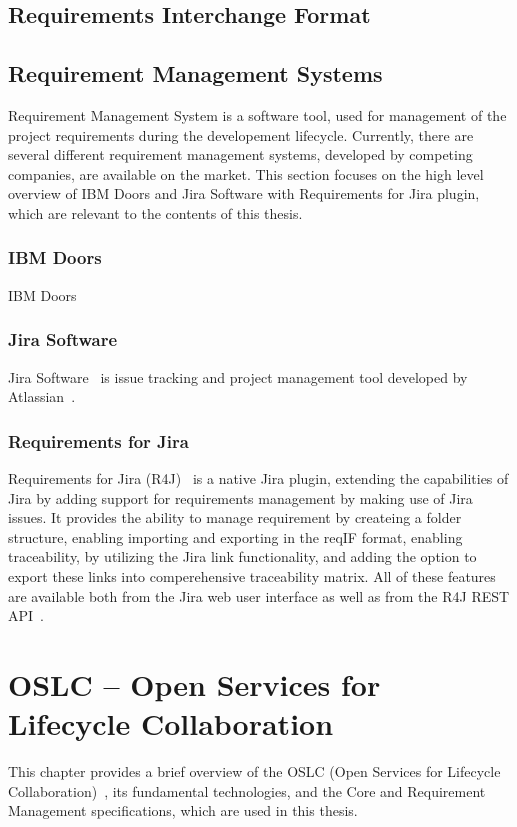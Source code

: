 \section{Requirements Interchange Format}

\section{Requirement Management Systems}
Requirement Management System is a software tool, used for management of the project requirements during the developement lifecycle. Currently, there are several different requirement management systems, developed by competing companies, are available on the market. This section focuses on the high level overview of IBM Doors and Jira Software with Requirements for Jira plugin, which are relevant to the contents of this thesis.

\subsection{IBM Doors}
IBM Doors \cite{ibm_doors} 

\subsection{Jira Software}
Jira Software \cite{jira} is issue tracking and project management tool developed by Atlassian \cite{atlassian}.

\subsection*{Requirements for Jira}
Requirements for Jira (R4J) \cite{requirements_for_jira} is a native Jira plugin, extending the capabilities of Jira by adding support for requirements management by making use of Jira issues. It provides the ability to manage requirement by createing a folder structure, enabling importing and exporting in the reqIF format, enabling traceability, by utilizing the Jira link functionality, and adding the option to export these links into comperehensive traceability matrix. All of these features are available both from the Jira web user interface as well as from the R4J REST API \cite{r4j_api}.


\chapter{OSLC -- Open Services for Lifecycle Collaboration}
This chapter provides a brief overview of the OSLC (Open Services for Lifecycle Collaboration) \cite{oslc}, its fundamental technologies, and the Core and Requirement Management specifications, which are used in this thesis.

